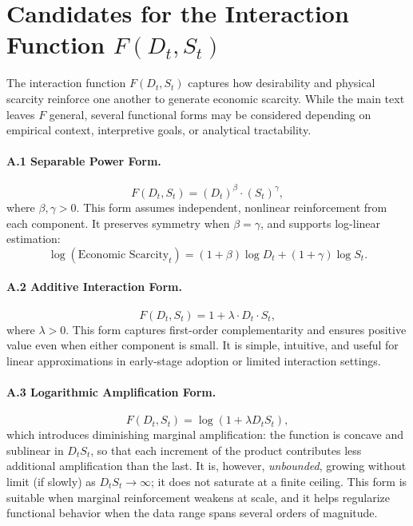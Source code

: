 \documentclass[12pt]{article}
\begin{document}
\clearpage
\appendix
\section{Candidates for the Interaction Function \( F(D_t, S_t) \)}
\label{appendix:f_forms}

The interaction function \( F(D_t, S_t) \) captures how desirability and physical scarcity reinforce one another to generate economic scarcity. While the main text leaves \( F \) general, several functional forms may be considered depending on empirical context, interpretive goals, or analytical tractability.

\paragraph{A.1 Separable Power Form.}  
\begin{equation}
F(D_t, S_t) = (D_t)^\beta \cdot (S_t)^\gamma,
\tag{A.1}
\end{equation}
where \( \beta, \gamma > 0 \). This form assumes independent, nonlinear reinforcement from each component. It preserves symmetry when \( \beta = \gamma \), and supports log-linear estimation:
\[
\log(\text{Economic Scarcity}_t) = (1+\beta) \log D_t + (1+\gamma) \log S_t.
\]

\paragraph{A.2 Additive Interaction Form.}  
\begin{equation}
F(D_t, S_t) = 1 + \lambda \cdot D_t \cdot S_t,
\tag{A.2}
\end{equation}
where \( \lambda > 0 \). This form captures first-order complementarity and ensures positive value even when either component is small. It is simple, intuitive, and useful for linear approximations in early-stage adoption or limited interaction settings.

\paragraph{A.3 Logarithmic Amplification Form.}  
\begin{equation}
F(D_t, S_t) = \log(1 + \lambda D_t S_t),
\tag{A.3}
\end{equation}
which introduces diminishing marginal amplification: the function is concave and sublinear in \( D_t S_t \), so that each increment of the product contributes less additional amplification than the last. It is, however, \emph{unbounded}, growing without limit (if slowly) as \( D_t S_t \to \infty \); it does not saturate at a finite ceiling. This form is suitable when marginal reinforcement weakens at scale, and it helps regularize functional behavior when the data range spans several orders of magnitude.
\end{document}
